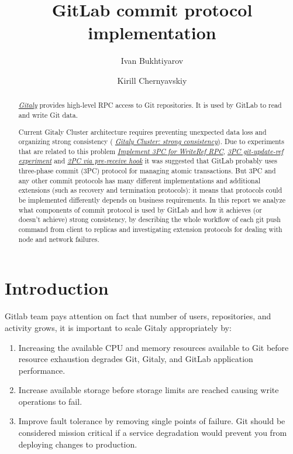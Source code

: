 \documentclass[acmlarge, screen, nonacm]{acmart}
\title{GitLab commit protocol implementation}
\author{Ivan Bukhtiyarov}
\author{Kirill Chernyavskiy}
\begin{document}
\begin{abstract}
  \emph{\href{https://gitlab.com/gitlab-org/gitaly}{Gitaly}}
  provides high-level RPC access to Git repositories. It is used by GitLab to read and write Git data.
  
  Current Gitaly Cluster architecture requires preventing unexpected data loss and organizing strong consistency (
  \emph{\href{https://gitlab.com/groups/gitlab-org/-/epics/1189}{Gitaly Cluster: strong consistency}}).
  Due to experiments that are related to this problem
  \emph{\href{https://gitlab.com/gitlab-org/gitaly/-/issues/2466}{Implement 3PC for WriteRef RPC}},
  \emph{\href{https://gitlab.com/gitlab-org/gitaly/-/issues/2529}{3PC git-update-ref experiment}} and
  \emph{\href{https://gitlab.com/gitlab-org/gitaly/-/issues/2635}{2PC via pre-receive hook}}
  it was suggested that GitLab probably uses three-phase commit (3PC) protocol for managing atomic transactions. 
  But 3PC and any other commit protocols has many different implementations and
  additional extensions (such as recovery and termination protocols): it means that protocols could
  be implemented differently depends on business requirements. In this report we analyze what
  components of commit protocol is used by GitLab and how it achieves (or doesn't achieve) 
  strong consistency, by describing the whole workflow of each git push command from 
  client to replicas and investigating extension protocols for dealing with node and network failures.
\end{abstract}

\maketitle

\section{Introduction}

Gitlab team pays attention on fact that number of users, repositories, and activity grows, it is important to scale Gitaly appropriately by:

\begin{enumerate}
\item Increasing the available CPU and memory resources available to Git before resource
exhaustion degrades Git, Gitaly, and GitLab application performance.
\item Increase available storage before storage limits are reached causing write operations to fail.
\item Improve fault tolerance by removing single points of failure. Git should be considered
mission critical if a service degradation would prevent you from deploying changes to production.
\end{enumerate}
\end{document}
